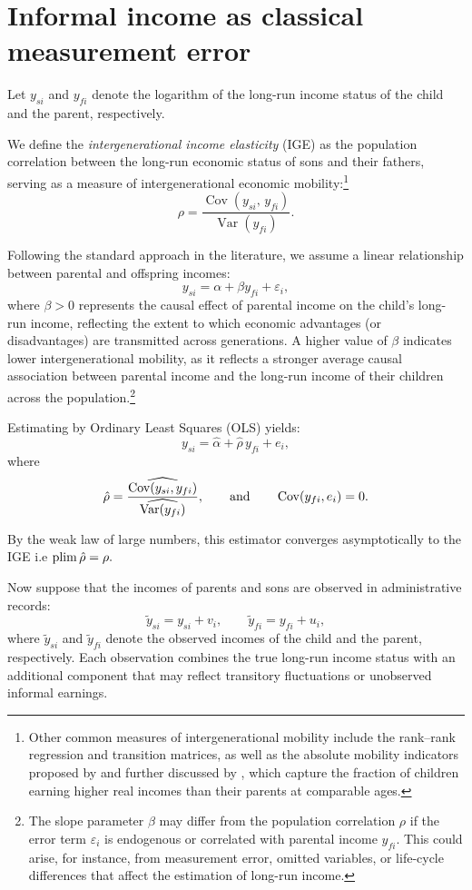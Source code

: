 
\section{Informal income as classical measurement error}
Let $y_{si}$ and $y_{fi}$ denote the logarithm of the long-run income status of the child and the parent, respectively.

We define the \textit{intergenerational income elasticity} (IGE) as the population correlation between the long-run economic status of sons and their fathers, serving as a measure of intergenerational economic mobility:\footnote{Other common measures of intergenerational mobility include the rank–rank regression and transition matrices, as well as the absolute mobility indicators proposed by \textcite{Chetty_2014} and further discussed by \textcite{Berman_2022}, which capture the fraction of children earning higher real incomes than their parents at comparable ages.}
\[
\rho = \frac{\operatorname{Cov}(y_{si},\, y_{fi})}{\operatorname{Var}(y_{fi})}.
\]

Following the standard approach in the literature, we assume a linear relationship between parental and offspring incomes:
\[
y_{si} = \alpha + \beta y_{fi} + \varepsilon_{i},
\]
where $\beta>0$ represents the causal effect of parental income on the child’s long-run income, reflecting the extent to which economic advantages (or disadvantages) are transmitted across generations.
A higher value of $\beta$ indicates lower intergenerational mobility, as it reflects a stronger average causal association between parental income and the long-run income of their children across the population.\footnote{The slope parameter $\beta$ may differ from the population correlation $\rho$ if the error term $\varepsilon_i$ is endogenous or correlated with parental income $y_{fi}$. This could arise, for instance, from measurement error, omitted variables, or life-cycle differences that affect the estimation of long-run income.}

Estimating by Ordinary Least Squares (OLS) yields:
\[
y_{si} = \hat{\alpha} + \hat{\rho}\, y_{fi} + e_i,
\]
where
\[
\hat{\rho} = \frac{\widehat{\operatorname{Cov}(y_{si},y_{fi})}}{\widehat{\operatorname{Var}(y_{fi})}},
\qquad \text{and} \qquad \operatorname{Cov}(y_{fi},e_i) = 0.
\]

By the weak law of large numbers, this estimator converges asymptotically to the IGE i.e $\operatorname*{plim} \hat{\rho} = \rho.$

Now suppose that the incomes of parents and sons are observed in administrative records:
\[
\tilde{y}_{si} = y_{si}+ v_i, \qquad
\tilde{y}_{fi}= y_{fi} + u_i,
\]
where $\tilde{y}_{si}$ and $\tilde{y}_{fi}$ denote the observed incomes of the child and the parent, respectively.  
Each observation combines the true long-run income status with an additional component that may reflect transitory fluctuations or unobserved informal earnings.

